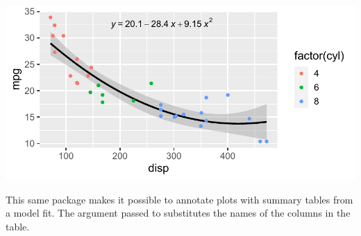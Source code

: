 \documentclass[krantz2]{krantz}\usepackage{knitr}
\begin{document}
\begin{knitrout}\footnotesize
{}\color{fgcolor}\begin{kframe}
\begin{alltt}
 \hlkwb{<-}  \hlopt{~}  \hlopt{+} \hlopt{^}\hlstd{)}
 \hlopt{+} \hlstd{(} \hlstd{=}  \hlopt{+}
  \hlstd{(}   \hlstd{=} \hlstd{)} \hlopt{+}
  \hlstd{(}   \hlstd{=} \hlstd{(}\hlstd{(}\hlstd{,} \hlstd{)),}
                \hlstd{=} \hlstd{,}  \hlstd{=} \hlstd{)}
\end{alltt}
\end{kframe}

{\centering \includegraphics[width=.7\textwidth]{figure/pos-smooth-plot-12-1} 

}


\end{knitrout}

This same package makes it possible to annotate plots with summary tables from a model fit. The argument passed to  substitutes the names of the columns in the table.
\end{document}
